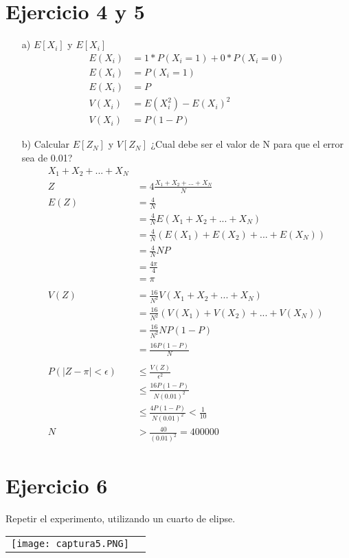 \documentclass[10pt]{article}\usepackage[]{graphicx}\usepackage[]{color}
\begin{document}
\section{Ejercicio 4 y 5}
\begin{itemize}
\item[a)]$E[X_i]$ y $E[X_i]$\\
\begin{align*}
E(X_i)&=1*P(X_i=1)+0*P(X_i=0)\\
E(X_i)&=P(X_i=1)\\
E(X_i)&=P\\
V(X_i)&=E(X_i^2)-E(X_i)^2\\
V(X_i)&=P(1-P)
\end{align*}
\item[b)] Calcular $E[Z_N]$ y $V[Z_N]$ ¿Cual debe ser el valor de N para que el error sea de 0.01?
\begin{align*}
X_1+X_2+...+X_N\\
Z&=4\frac{X_1+X_2+...+X_N}{N}\\
E(Z)&=\frac{4}{N}\\
&=\frac{4}{N}E(X_1+X_2+...+X_N)\\
&=\frac{4}{N}(E(X_1)+E(X_2)+...+E(X_N))\\
&=\frac{4}{N}NP\\
&=\frac{4\pi}{4}\\
&=\pi\\ \\
V(Z)&=\frac{16}{N^2}V(X_1+X_2+...+X_N)\\
&=\frac{16}{N^2}(V(X_1)+V(X_2)+...+V(X_N))\\
&=\frac{16}{N^2}NP(1-P)\\
&=\frac{16P(1-P)}{N}\\ \\
P(|Z-\pi|<\epsilon)&\leq \frac{V(Z)}{\epsilon^2}\\
&\leq \frac{16 P(1-P)}{N(0.01)^2}\\
&\leq \frac{4 P(1-P)}{N(0.01)^2} <\frac{1}{10}\\
N&>\frac{40}{(0.01)^2}=400000
\end{align*}
\end{itemize}



\section{Ejercicio 6}

Repetir el experimento, utilizando un cuarto de elipse.\\
\begin{tabular}{p{} p{} }
\texttt{[image: captura5.PNG]}
\end{tabular}\\
\end{document}
